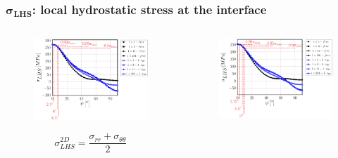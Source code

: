 \documentclass[first,firstsupp,lastsupp,last,hyperref,table]{ETHclass}
\begin{document}
\begin{frame}
\frametitle{\vspace{0.2cm}\small $\mathbf{\sigma_{LHS}}$: local hydrostatic stress at the interface}
\vspace{-.75cm}
\centering
\begin{columns}[c]
\centering
\begin{column}{0.5\textwidth}
\centering
\begin{figure}
\centering
\includegraphics[width=\columnwidth]{vf60-nodamage-p2D.pdf}
\end{figure}
\vspace{-0.5cm}
\scriptsize
\begin{equation*}
\sigma^{2D}_{LHS}=\frac{\sigma_{rr}+\sigma_{\theta\theta}}{2}
\end{equation*}
\end{column}
\begin{column}{0.5\textwidth}
\centering
\begin{figure}
\centering
\includegraphics[width=\columnwidth]{vf60-nodamage-p3D.pdf}

\end{figure}
\end{column}
\end{columns}
\end{frame}
\end{document}
